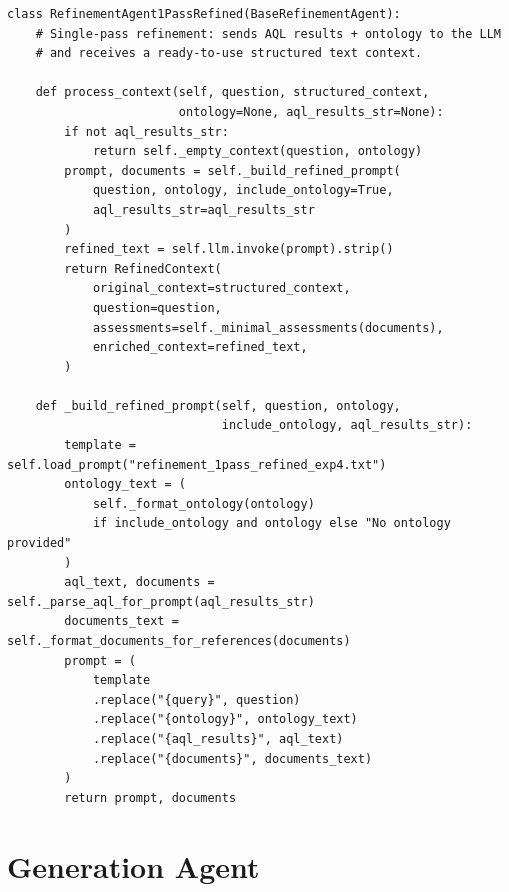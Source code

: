 \begin{lstlisting}[style=pythonstyle,
caption={Refinement Agent: \texttt{process\_context} and
\texttt{\_build\_refined\_prompt} methods.},
label={lst:code-refinement}]
class RefinementAgent1PassRefined(BaseRefinementAgent):
    # Single-pass refinement: sends AQL results + ontology to the LLM
    # and receives a ready-to-use structured text context.

    def process_context(self, question, structured_context,
                        ontology=None, aql_results_str=None):
        if not aql_results_str:
            return self._empty_context(question, ontology)
        prompt, documents = self._build_refined_prompt(
            question, ontology, include_ontology=True,
            aql_results_str=aql_results_str
        )
        refined_text = self.llm.invoke(prompt).strip()
        return RefinedContext(
            original_context=structured_context,
            question=question,
            assessments=self._minimal_assessments(documents),
            enriched_context=refined_text,
        )

    def _build_refined_prompt(self, question, ontology,
                              include_ontology, aql_results_str):
        template = self.load_prompt("refinement_1pass_refined_exp4.txt")
        ontology_text = (
            self._format_ontology(ontology)
            if include_ontology and ontology else "No ontology provided"
        )
        aql_text, documents = self._parse_aql_for_prompt(aql_results_str)
        documents_text = self._format_documents_for_references(documents)
        prompt = (
            template
            .replace("{query}", question)
            .replace("{ontology}", ontology_text)
            .replace("{aql_results}", aql_text)
            .replace("{documents}", documents_text)
        )
        return prompt, documents
\end{lstlisting}

\section{Generation Agent}\label{app:code-generation}

